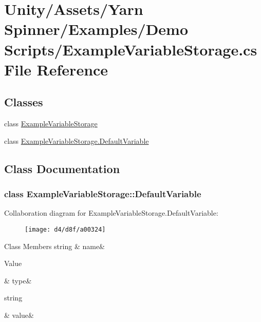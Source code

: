 \hypertarget{a00255}{\section{Unity/\-Assets/\-Yarn Spinner/\-Examples/\-Demo Scripts/\-Example\-Variable\-Storage.cs File Reference}
\label{a00255}
}
\subsection*{Classes}
\begin{DoxyCompactItemize}
\item 
class \hyperlink{a00067}{Example\-Variable\-Storage}
\item 
class \hyperlink{a00067_d0/d39/a00314}{Example\-Variable\-Storage.\-Default\-Variable}
\end{DoxyCompactItemize}


\subsection{Class Documentation}
\label{d0/d39/a00314}
\hypertarget{a00067_d0/d39/a00314}{}
\subsubsection{class Example\-Variable\-Storage\-:\-:Default\-Variable}


Collaboration diagram for Example\-Variable\-Storage.\-Default\-Variable\-:
\nopagebreak
\begin{figure}[H]
\begin{center}
\leavevmode
\texttt{[image: d4/d8f/a00324]}
\end{center}
\end{figure}
\begin{DoxyFields}{Class Members}
\hypertarget{a00067_a609feaa53936e7dc42248ff2ba68454a}{string}\label{a00067_a609feaa53936e7dc42248ff2ba68454a}
&
name&
\\
\hline

\hypertarget{a00067_a904347efdca12f40243c7dedb646153d}{Value}\label{a00067_a904347efdca12f40243c7dedb646153d}
&
type&
\\
\hline

\hypertarget{a00067_a0f00ecb21b58aa754a4bbb61edf62818}{string}\label{a00067_a0f00ecb21b58aa754a4bbb61edf62818}
&
value&
\\
\hline

\end{DoxyFields}
